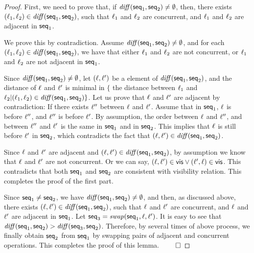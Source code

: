 \begin {proof}

First, we need to prove that, if $\mathit{diff}(\mathsf{seq}_1,\mathsf{seq}_2) \neq \emptyset$, then, there exists $(\ell_1,\ell_2) \in \mathit{diff}(\mathsf{seq}_1,\mathsf{seq}_2)$, such that $\ell_1$ and $\ell_2$ are concurrent, and $\ell_1$ and $\ell_2$ are adjacent in $\mathsf{seq}_1$.

We prove this by contradiction. Assume $\mathit{diff}(\mathsf{seq}_1,\mathsf{seq}_2) \neq \emptyset$, and for each $(\ell_1,\ell_2) \in \mathit{diff}(\mathsf{seq}_1,\mathsf{seq}_2)$, we have that either $\ell_1$ and $\ell_2$ are not concurrent, or $\ell_1$ and $\ell_2$ are not adjacent in $\mathsf{seq}_1$.

Since $\mathit{diff}(\mathsf{seq}_1,\mathsf{seq}_2) \neq \emptyset$, let $(\ell,\ell')$ be a element of $\mathit{diff}(\mathsf{seq}_1,\mathsf{seq}_2)$, and the distance of $\ell$ and $\ell'$ is minimal in $\{$ the distance between $\ell_1$ and $\ell_2 \vert (\ell_1,\ell_2) \in \mathit{diff}(\mathsf{seq}_1,\mathsf{seq}_2) \}$. Let us prove that $\ell$ and $\ell'$ are adjacent by contradiction: If there exists $\ell''$ between $\ell$ and $\ell'$. Assume that in $\mathsf{seq}_1$, $\ell$ is before $\ell''$, and $\ell''$ is before $\ell'$. By assumption, the order between $\ell$ and $\ell''$, and between $\ell''$ and $\ell'$ is the same in $\mathsf{seq}_1$ and in $\mathsf{seq}_2$. This implies that $\ell$ is still before $\ell'$ in $\mathsf{seq}_2$, which contradicts the fact that $(\ell,\ell') \in \mathit{diff}(\mathsf{seq}_1,\mathsf{seq}_2)$.

Since $\ell$ and $\ell'$ are adjacent and $(\ell,\ell') \in \mathit{diff}(\mathsf{seq}_1,\mathsf{seq}_2)$, by assumption we know that $\ell$ and $\ell'$ are not concurrent. Or we can say, $(\ell,\ell') \in \mathsf{vis} \vee (\ell',\ell) \in \mathsf{vis}$. This contradicts that both $\mathsf{seq}_1$ and $\mathsf{seq}_2$ are consistent with visibility relation. This completes the proof of the first part.

Since $\mathsf{seq}_1 \neq \mathsf{seq}_2$, we have $\mathit{diff}(\mathsf{seq}_1,\mathsf{seq}_2) \neq \emptyset$, and then, as discussed above, there exists $(\ell,\ell') \in \mathit{diff}(\mathsf{seq}_1,\mathsf{seq}_2)$, such that $\ell$ and $\ell'$ are concurrent, and $\ell$ and $\ell'$ are adjacent in $\mathsf{seq}_1$. Let $\mathsf{seq}_3 = \mathit{swap}(\mathsf{seq}_1,\ell,\ell')$. It is easy to see that $\mathit{diff}(\mathsf{seq}_1,\mathsf{seq}_2) > \mathit{diff}(\mathsf{seq}_3,\mathsf{seq}_2)$. Therefore, by several times of above process, we finally obtain $\mathsf{seq}_2$ from $\mathsf{seq}_1$ by swapping pairs of adjacent and concurrent operations. This completes the proof of this lemma. $\qed$
\end {proof}



